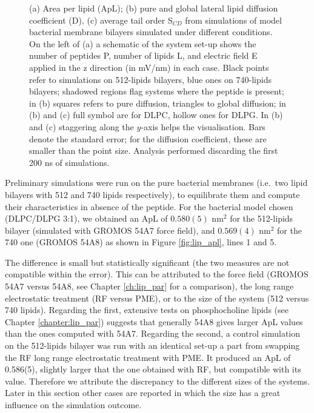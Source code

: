 \begin{figure}
\caption[ApL, D and S$_{CD}$ for membrane simulations]{(a) Area per lipid (ApL); (b) pure and global lateral lipid diffusion coefficient (D), (c) average tail order S$_{CD}$ from simulations of model bacterial membrane bilayers simulated under different conditions. On the left of (a) a schematic of the system set-up shows the number of peptides P, number of lipids L, and electric field E applied in the z direction (in mV/nm) in each case. 
%
Black points refer to simulations on 512-lipids bilayers, blue ones on 740-lipids bilayers; shadowed regions flag systems where the peptide is present; in (b) squares refers to pure diffusion, triangles to global diffusion; in (b) and (c) full symbol are for DLPC, hollow ones for DLPG.
In (b) and (c) staggering along the $y$-axis helps the visualisation.
%
Bars denote the standard error; for the diffusion coefficient, these are smaller than the point size. Analysis performed discarding the first 200 ns of simulations.}
\label{fig:lipids_ApL_D}
\end{figure}

Preliminary simulations were run on the pure bacterial membranes (i.e.\ two lipid bilayers with 512 and 740 lipids respectively), to equilibrate them and compute their characteristics in absence of the peptide.
%
For the bacterial model chosen (DLPC/DLPG 3:1), we obtained an ApL of $0.580(5)$ nm$^2$ for the 512-lipids bilayer (simulated with GROMOS 54A7 force field), and  $0.569(4)$ nm$^2$ for the 740 one (GROMOS 54A8) as shown in Figure \ref{fig:lip_apl}, lines 1 and 5.

The difference is small but statistically significant (the two measures are not compatible within the error).
%
This can be attributed to the force field (GROMOS 54A7 versus 54A8, see Chapter \ref{ch:lip_par} for a comparison), the long range electrostatic treatment (RF versus PME), or to the size of the system (512 versus 740 lipids). %
%
Regarding the first, extensive tests on phosphocholine lipids (see Chapter \ref{chapter:lip_par}) suggests that generally 54A8 gives larger ApL values than the ones computed with 54A7.
%
Regarding the second, a control simulation on the 512-lipids bilayer was run with an identical set-up a part from swapping the RF long range electrostatic treatment with PME. It produced an ApL of 0.586(5), slightly larger that the one obtained with RF, but compatible with its value.
%
Therefore we attribute the discrepancy to the different sizes of the systems. Later in this section other cases are reported in which the size has a great influence on the simulation outcome.

